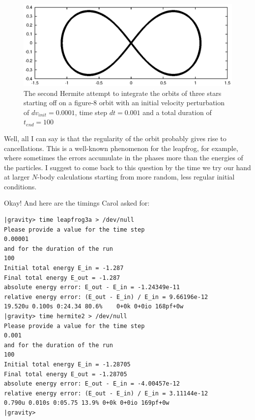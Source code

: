 \begin{figure}[htb]
\centering
\includegraphics[width=4.5in]{chap6/hermite2_0.001_100.ps}
\caption[Three stars on a figure-8 orbit, Hermite, $dv_{init}=0.0001$,
$dt = 0.001$, $t_{end} = 100$]
{The second Hermite attempt to integrate the orbits of three stars
starting off on a figure-8 orbit with an initial velocity perturbation of 
$dv_{init}=0.0001$, time step $dt = 0.001$ and a total duration of
$t_{end} = 100$}
\label{fig:hermite2-0.001-100}
\end{figure}

\abc

\alice
Well, all I can say is that the regularity of the orbit probably gives
rise to cancellations.  This is a well-known phenomenon for the
leapfrog, for example, where sometimes the errors accumulate in the
phases more than the energies of the particles.  I suggest to come
back to this question by the time we try our hand at larger $N$-body
calculations starting from more random, less regular initial conditions.

\bob
Okay!  And here are the timings Carol asked for:

\cba

\begin{small}
\begin{verbatim}
|gravity> time leapfrog3a > /dev/null
Please provide a value for the time step
0.00001
and for the duration of the run
100
Initial total energy E_in = -1.287
Final total energy E_out = -1.287
absolute energy error: E_out - E_in = -1.24349e-11
relative energy error: (E_out - E_in) / E_in = 9.66196e-12
19.520u 0.100s 0:24.34 80.6%	0+0k 0+0io 168pf+0w
|gravity> time hermite2 > /dev/null
Please provide a value for the time step
0.001
and for the duration of the run
100
Initial total energy E_in = -1.28705
Final total energy E_out = -1.28705
absolute energy error: E_out - E_in = -4.00457e-12
relative energy error: (E_out - E_in) / E_in = 3.11144e-12
0.790u 0.010s 0:05.75 13.9%	0+0k 0+0io 169pf+0w
|gravity> 
\end{verbatim}
\end{small}

